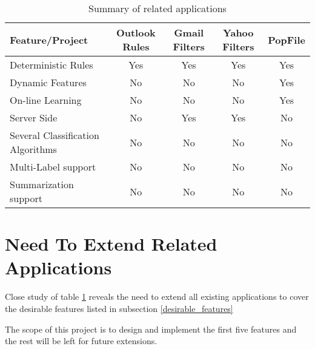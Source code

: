 \begin{center}
  \begin{table}[H]
    \begin{tabular}{ | p{3cm} | c | c | c | c |}
      \hline
      Feature/Project              & Outlook Rules \cite{OUTLOOK_REF} & Gmail Filters \cite{GMAIL_FILTERS} & 
                        Yahoo Filters \cite{YAHOO_FILTERS} & PopFile \cite{POPFILE} \\ \hline
      Deterministic Rules  &    Yes        &    Yes        &    Yes      &    Yes  \\ \hline     
      Dynamic Features &    No        &    No         &    No        &    Yes  \\ \hline
      On-line Learning &    No        &    No         &    No        &    Yes  \\ \hline
      Server Side      &    No        &    Yes        &    Yes       &    No   \\ \hline
      Several Classification Algorithms &    No        &    No &    No       &    No   \\ \hline
      Multi-Label support &    No        &    No &    No       &    No   \\ \hline
      Summarization support&    No        &    No &    No       &    No   \\ \hline
    \end{tabular}
    \caption[Summary of related work]{Summary of related applications}
    \label{related_applications_summary}
  \end{table}
\end{center}  


\section{Need To Extend Related Applications}
\label{sec:need_to_extend}
Close study of table \ref{related_applications_summary} reveals the need to extend all existing applications to cover the desirable features listed in subsection \ref{desirable_features}

The scope of this project is to design and implement the first five features and the rest will be left for future extensions.

